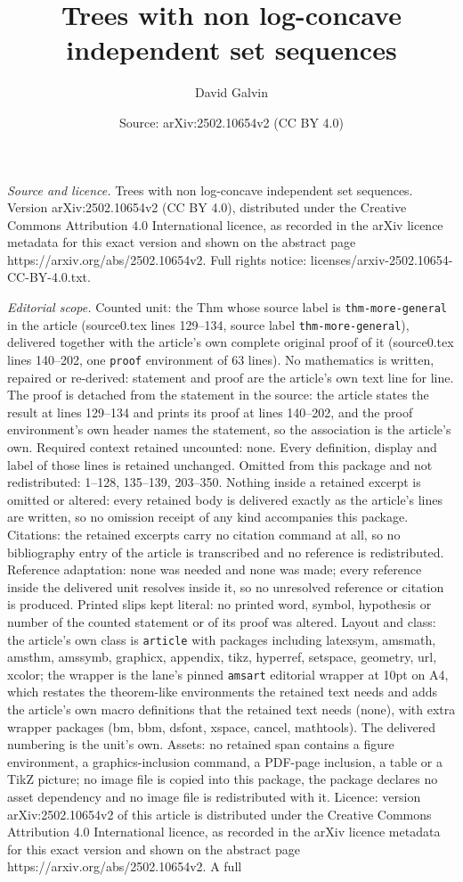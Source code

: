 \documentclass[10pt,a4paper]{amsart}
\title[Trees with non log-concave independent set sequences]{Trees with non log-concave independent set sequences}
\author{David Galvin}
\date{Source: arXiv:2502.10654v2 (CC BY 4.0)}
\begin{document}
\maketitle

\noindent\emph{Source and licence.} Trees with non log-concave independent set sequences. Version arXiv:2502.10654v2 (CC BY 4.0), distributed under the Creative Commons Attribution 4.0 International licence, as recorded in the arXiv licence metadata for this exact version and shown on the abstract page https://arxiv.org/abs/2502.10654v2. Full rights notice: licenses/arxiv-2502.10654-CC-BY-4.0.txt.\par\smallskip

\noindent\textit{Editorial scope.} Counted unit: the Thm whose source label is \texttt{thm-more-general} in the article (source0.tex lines 129--134, source label \texttt{thm-more-general}), delivered together with the article's own complete original proof of it (source0.tex lines 140--202, one \texttt{proof} environment of 63 lines). No mathematics is written, repaired or re-derived: statement and proof are the article's own text line for line. The proof is detached from the statement in the source: the article states the result at lines 129--134 and prints its proof at lines 140--202, and the proof environment's own header names the statement, so the association is the article's own. Required context retained uncounted: none. Every definition, display and label of those lines is retained unchanged. Omitted from this package and not redistributed: 1--128, 135--139, 203--350. Nothing inside a retained excerpt is omitted or altered: every retained body is delivered exactly as the article's lines are written, so no omission receipt of any kind accompanies this package. Citations: the retained excerpts carry no citation command at all, so no bibliography entry of the article is transcribed and no reference is redistributed. Reference adaptation: none was needed and none was made; every reference inside the delivered unit resolves inside it, so no unresolved reference or citation is produced. Printed slips kept literal: no printed word, symbol, hypothesis or number of the counted statement or of its proof was altered. Layout and class: the article's own class is \texttt{article} with packages including latexsym, amsmath, amsthm, amssymb, graphicx, appendix, tikz, hyperref, setspace, geometry, url, xcolor; the wrapper is the lane's pinned \texttt{amsart} editorial wrapper at 10pt on A4, which restates the theorem-like environments the retained text needs and adds the article's own macro definitions that the retained text needs (none), with extra wrapper packages (bm, bbm, dsfont, xspace, cancel, mathtools). The delivered numbering is the unit's own. Assets: no retained span contains a figure environment, a graphics-inclusion command, a PDF-page inclusion, a table or a TikZ picture; no image file is copied into this package, the package declares no asset dependency and no image file is redistributed with it. Licence: version arXiv:2502.10654v2 of this article is distributed under the Creative Commons Attribution 4.0 International licence, as recorded in the arXiv licence metadata for this exact version and shown on the abstract page https://arxiv.org/abs/2502.10654v2. A full 
\end{document}
